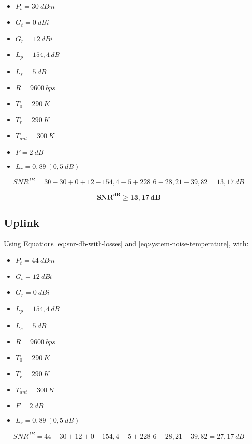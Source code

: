 \begin{itemize}
    \item $P_{t} = 30\ dBm$
    \item $G_{t} = 0\ dBi$
    \item $G_{r} = 12\ dBi$
    \item $L_{p} = 154,4\ dB$
    \item $L_{s} = 5\ dB$
    \item $R = 9600\ bps$
    \item $T_{0} = 290\ K$
    \item $T_{r} = 290\ K$
    \item $T_{ant} = 300\ K$
    \item $F = 2\ dB$
    \item $L_{r} = 0,89\ (0,5\ dB)$
\end{itemize}

\begin{equation}
    SNR^{dB} = 30 - 30 + 0 + 12 - 154,4 - 5 + 228,6 - 28,21 - 39,82 = 13,17\ dB
\end{equation}

\begin{equation}
\mathbf{SNR^{dB} \geq 13,17\ dB}
\end{equation}

\subsection{Uplink}

Using Equations \ref{eq:snr-db-with-losses} and \ref{eq:system-noise-temperature}, with:

\begin{itemize}
    \item $P_{t} = 44\ dBm$
    \item $G_{t} = 12\ dBi$
    \item $G_{r} = 0\ dBi$
    \item $L_{p} = 154,4\ dB$
    \item $L_{s} = 5\ dB$
    \item $R = 9600\ bps$
    \item $T_{0} = 290\ K$
    \item $T_{r} = 290\ K$
    \item $T_{ant} = 300\ K$
    \item $F = 2\ dB$
    \item $L_{r} = 0,89\ (0,5\ dB)$
\end{itemize}

\begin{equation}
    SNR^{dB} = 44 - 30 + 12 + 0 - 154,4 - 5 + 228,6 - 28,21 - 39,82 = 27,17\ dB
\end{equation}

